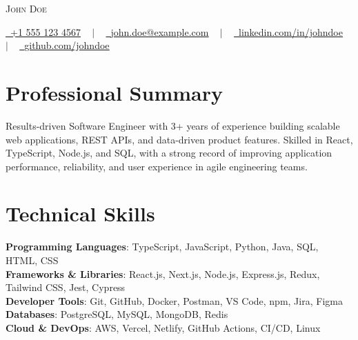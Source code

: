 \documentclass[letterpaper,11pt]{article}
\makeatletter
\newcommand{\ResumeName}{John Doe}
\newcommand{\ResumePhoneDisplay}{+1 555 123 4567}
\newcommand{\ResumePhoneLink}{+15551234567}
\newcommand{\ResumeEmail}{john.doe@example.com}
\newcommand{\ResumeLinkedInDisplay}{linkedin.com/in/johndoe}
\newcommand{\ResumeLinkedInUrl}{https://linkedin.com/in/johndoe}
\newcommand{\ResumeGitHubDisplay}{github.com/johndoe}
\newcommand{\ResumeGitHubUrl}{https://github.com/johndoe}
\makeatother
\begin{document}
\begin{center}
    {\Huge \scshape \ResumeName} \\ \vspace{8pt}
    
    \small 
    \href{tel:\ResumePhoneLink}{\raisebox{-0.1\height}\faPhone\ \underline{\ResumePhoneDisplay}} ~ $|$ ~
    \href{mailto:\ResumeEmail}{\raisebox{-0.2\height}\faEnvelope\ \underline{\ResumeEmail}} ~ $|$ ~
    \href{\ResumeLinkedInUrl}{\raisebox{-0.2\height}\faLinkedin\ \underline{\ResumeLinkedInDisplay}} ~ $|$ ~
    \href{\ResumeGitHubUrl}{\raisebox{-0.2\height}\faGithub\ \underline{\ResumeGitHubDisplay}}
    
    \vspace{-8pt}
\end{center}

\section{Professional Summary}
\begin{justify}
\small{Results-driven Software Engineer with 3+ years of experience building scalable web applications, REST APIs, and data-driven product features. Skilled in React, TypeScript, Node.js, and SQL, with a strong record of improving application performance, reliability, and user experience in agile engineering teams.}
\end{justify}
\vspace{-10pt}

\section{Technical Skills}
\begin{itemize}[leftmargin=0.15in, label={}]
    \small{\item{
        \textbf{Programming Languages}{: TypeScript, JavaScript, Python, Java, SQL, HTML, CSS} \\
        \textbf{Frameworks \& Libraries}{: React.js, Next.js, Node.js, Express.js, Redux, Tailwind CSS, Jest, Cypress} \\
        \textbf{Developer Tools}{: Git, GitHub, Docker, Postman, VS Code, npm, Jira, Figma} \\
        \textbf{Databases}{: PostgreSQL, MySQL, MongoDB, Redis} \\
        \textbf{Cloud \& DevOps}{: AWS, Vercel, Netlify, GitHub Actions, CI/CD, Linux}
    }}
\end{itemize}
\vspace{-16pt}
\end{document}
